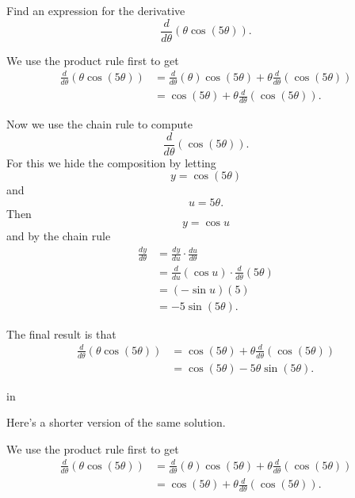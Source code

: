 \documentclass{ximera}
\newcommand{\pskip}{\vskip 0.1 in}
\begin{document}
\begin{example}  \label{E"MMDNBRR}
Find an expression for the derivative 
\[
  \frac{d}{d\theta} \left( \theta \cos (5\theta) \right) .
\]

\begin{explanation}

We use the product rule first to get
\begin{align*}
       \frac{d}{d\theta} \left( \theta \cos (5\theta) \right) &= \frac{d}{d\theta} \left(  \theta \right) \cos (5\theta) + \theta \frac{d}{d\theta} \left(  \cos (5\theta) \right)  \\ 
                          &= \cos(5\theta) + \theta  \frac{d}{d\theta} \left(  \cos (5\theta) \right) .
\end{align*}

Now we use the chain rule to compute 
\[
     \frac{d}{d\theta} \left(  \cos (5\theta) \right) .
\]
For this we hide the composition by letting
\[
   y  = \cos (5\theta)
\]  
and 
\[
   u = 5\theta.
\]
Then 
\[
     y = \cos u
\]
and by the chain rule 
\begin{align*}
  \frac{dy}{d\theta}  &= \frac{dy}{du} \cdot \frac{du}{d\theta} \\
                              &= \frac{d}{du}\left( \cos u \right) \cdot \frac{d}{d\theta} \left( 5\theta \right)  \\
                              &= (-\sin u)(5) \\
                              & = -5 \sin (5\theta) . 
\end{align*}


The final result is that 
\begin{align*}
               \frac{d}{d\theta} \left( \theta \cos (5\theta) \right) &=  \cos(5\theta) + \theta  \frac{d}{d\theta} \left( \cos (5\theta) \right) \\
           & = \cos(5\theta) - 5\theta \sin (5\theta) .
\end{align*}


\pskip

Here's a shorter version of the same solution.

We use the product rule first to get
\begin{align*}
       \frac{d}{d\theta} \left( \theta \cos (5\theta) \right) &= \frac{d}{d\theta} \left(  \theta \right) \cos (5\theta) + \theta \frac{d}{d\theta} \left(  \cos (5\theta) \right)  \\ 
                          &= \cos(5\theta) + \theta  \frac{d}{d\theta} \left(  \cos (5\theta) \right) .
\end{align*}


\end{explanation}
\end{example}
\end{document}
